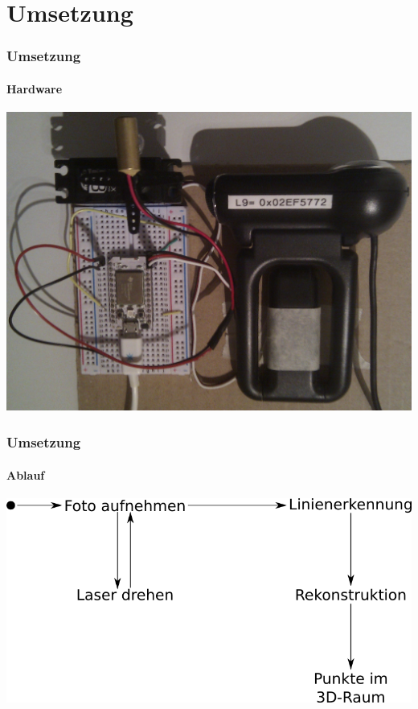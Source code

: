 \documentclass[xcolor=dvipsnames]{beamer}
\begin{document}
\section{Umsetzung} 
\begin{frame}
	\frametitle{Umsetzung}
	\framesubtitle{Hardware}

	\includegraphics[width=0.9\linewidth]{includes/hardware.jpg}

\end{frame}


\begin{frame}
	\frametitle{Umsetzung}
	\framesubtitle{Ablauf}

	\includegraphics[width=\linewidth]{includes/blockbild.png}

\end{frame}
\end{document}
